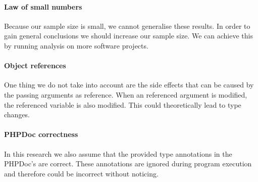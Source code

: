 \documentclass[main.tex]{subfiles}
\begin{document}
	\paragraph{Law of small numbers}
	Because our sample size is small, we cannot generalise these results.
	In order to gain general conclusions we should increase our sample size.
	We can achieve this by running analysis on more software projects.
	
	\paragraph{Object references}
	One thing we do not take into account are the side effects that can be caused by the passing arguments as reference.
	When an referenced argument is modified, the referenced variable is also modified.
	This could theoretically lead to type changes.
	
	\paragraph{PHPDoc correctness}
	In this research we also assume that the provided type annotations in the PHPDoc's are correct.
	These annotations are ignored during program execution and therefore could be incorrect without noticing. 

	
\end{document}
